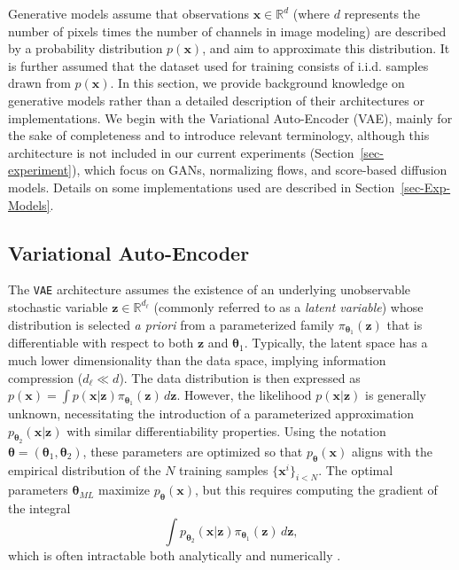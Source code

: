 \documentclass[fleqn,usenatbib]{mnras}
\begin{document}
Generative models assume that observations $\bm{x} \in \mathbb{R}^d$ (where $d$ represents the number of pixels times the number of channels in image modeling) are described by a probability distribution $p(\bm{x})$, and aim to approximate this distribution. It is further assumed that the dataset used for training consists of i.i.d. samples drawn from $p(\bm{x})$. In this section, we provide background knowledge on generative models rather than a detailed description of their architectures or implementations. We begin with the Variational Auto-Encoder (VAE), mainly for the sake of completeness and to introduce relevant terminology, although this architecture is not included in our current experiments (Section~\ref{sec-experiment}), which focus on GANs, normalizing flows, and score-based diffusion models. Details on some implementations used are described in Section~\ref{sec-Exp-Models}.

\subsection{Variational Auto-Encoder}

The \texttt{VAE} architecture \citep{Kingma2014} assumes the existence of an underlying unobservable stochastic variable $\bm{z} \in \mathbb{R}^{d_\ell}$ (commonly referred to as a \textit{latent variable}) whose distribution is selected \textit{a priori} from a parameterized family $\pi_{\bm{\theta}_1}(\bm{z})$ that is differentiable with respect to both $\bm{z}$ and $\bm{\theta}_1$. Typically, the latent space has a much lower dimensionality than the data space, implying information compression ($d_\ell \ll d$). The data distribution is then expressed as $p(\bm{x}) = \int p(\bm{x}|\bm{z}) \pi_{\bm{\theta}_1}(\bm{z}) \, d\bm{z}$. However, the likelihood $p(\bm{x}|\bm{z})$ is generally unknown, necessitating the introduction of a parameterized approximation $p_{\bm{\theta}_2}(\bm{x}|\bm{z})$ with similar differentiability properties. Using the notation $\bm{\theta} = (\bm{\theta}_1, \bm{\theta}_2)$, these parameters are optimized so that $p_{\bm{\theta}}(\bm{x})$ aligns with the empirical distribution of the $N$ training samples $\{\bm{x}^i\}_{i<N}$. The optimal parameters $\bm{\theta}_{ML}$ maximize $p_{\bm{\theta}}(\bm{x})$, but this requires computing the gradient of the integral 
\begin{equation}
\int p_{\bm{\theta}_2}(\bm{x}|\bm{z}) \pi_{\bm{\theta}_1}(\bm{z}) \, d\bm{z},
\end{equation}
which is often intractable both analytically and numerically \citep{Kingma2014}. 
\end{document}
